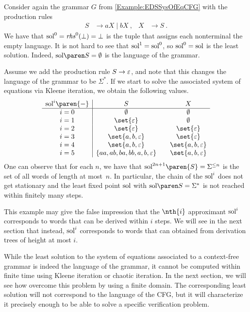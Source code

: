 \documentclass[../../diss.tex]{subfiles}
\begin{document}
\begin{example}%
    Consider again the grammar $G$ from \cref{Example:EDSSysOfEqCFG} with the production rules
    \begin{align*}
        S &\to aX \mid bX
        \ ,
        &
        X &\to S
        \ .
    \end{align*}
    We have that $\text{sol}^{0} = \mathit{rhs}^0(\bot) = \bot$ is the tuple that assigns each nonterminal the empty language.
    It is not hard to see that $\text{sol}^{1} = \text{sol}^{0}$, so $\soli{0} = \sol$ is the least solution.
    Indeed, $\sol{S} = \emptyset$ is the language of the grammar.

    Assume we add the production rule $S \to \varepsilon$, and note that this changes the language of the grammar to be $\Sigma^*$.
    If we start to solve the associated system of equations via Kleene iteration, we obtain the following values.
%
    \[
        \begin{array}{c|c@{\hskip 2em}c}
            \soli{i}\paren{-} & S & X
            \\
            \hline
            i = 0 & \emptyset & \emptyset
            \\
            i = 1 & \set{\eps} & \emptyset
            \\
            i = 2 & \set{\eps} & \set{\eps}
            \\
            i = 3 & \set{a,b,\eps} & \set{\eps}
            \\
            i = 4 & \set{a,b,\eps} & \set{a,b,\eps}
            \\
            i = 5 & \{aa,ab,ba, bb,a,b,\eps \} & \set{a,b,\eps}
        \end{array}
    \]
%
    One can observe that for each $n$, we have that $\soli{2n+1}\paren{S} = \Sigma^{\leq n}$ is the set of all words of length at most~$n$.
    In particular, the chain of the $\text{sol}^{i}$ does not get stationary and the least fixed point $\sol$ with $\sol{S} = \Sigma^*$ is not reached within finitely many steps.

    This example may give the false impression that the $\nth{i}$ approximant $\text{sol}^{i}$ corresponds to words that can be derived within $i$ steps.
    We will see in the next section that instead, $\text{sol}^{i}$ corresponds to words that can obtained from derivation trees of height at most $i$.
\end{example}

While the least solution to the system of equations associated to a context-free grammar is indeed the language of the grammar, it cannot be computed within finite time using Kleene iteration or chaotic iteration.
In the next section, we will see how overcome this problem by using a finite domain.
The corresponding least solution will not correspond to the language of the CFG, but it will characterize it precisely enough to be able to solve a specific verification problem.
\end{document}
